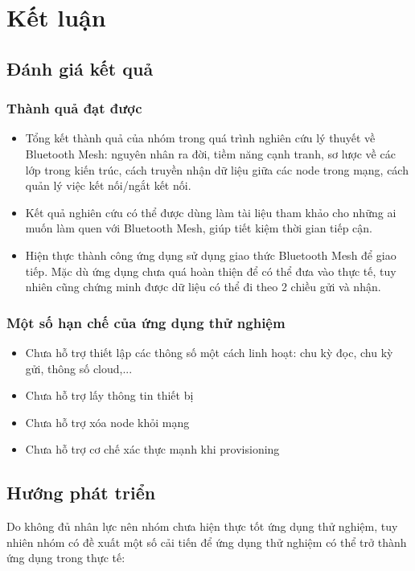 \chapter{Kết luận}\label{chap:conclude}
    \section{Đánh giá kết quả}
    	\subsection{Thành quả đạt được}
    	
    \begin{itemize}
        \item Tổng kết thành quả của nhóm trong quá trình nghiên cứu lý thuyết về Bluetooth Mesh: nguyên nhân ra đời, tiềm năng cạnh tranh, sơ lược về các lớp trong kiến trúc, cách truyền nhận dữ liệu giữa các node trong mạng, cách quản lý việc kết nối/ngắt kết nối.
        \item Kết quả nghiên cứu có thể được dùng làm tài liệu tham khảo cho những ai muốn làm quen với Bluetooth Mesh, giúp tiết kiệm thời gian tiếp cận.
        \item Hiện thực thành công ứng dụng sử dụng giao thức Bluetooth Mesh để giao tiếp. Mặc dù ứng dụng chưa quá hoàn thiện để có thể đưa vào thực tế, tuy nhiên cũng chứng minh được dữ liệu có thể đi theo 2 chiều gửi và nhận.
    \end{itemize}
    
    \subsection{Một số hạn chế của ứng dụng thử nghiệm}
    \begin{itemize}
        \item Chưa hỗ trợ thiết lập các thông số một cách linh hoạt: chu kỳ đọc, chu kỳ gửi, thông số cloud,...
        \item Chưa hỗ trợ lấy thông tin thiết bị
        \item Chưa hỗ trợ xóa node khỏi mạng
        \item Chưa hỗ trợ cơ chế xác thực mạnh khi provisioning
    \end{itemize}
    \section{Hướng phát triển}
    Do không đủ nhân lực nên nhóm chưa hiện thực tốt ứng dụng thử nghiệm, tuy nhiên nhóm có đề xuất một số cải tiến để ứng dụng thử nghiệm có thể trở thành ứng dụng trong thực tế:
    
